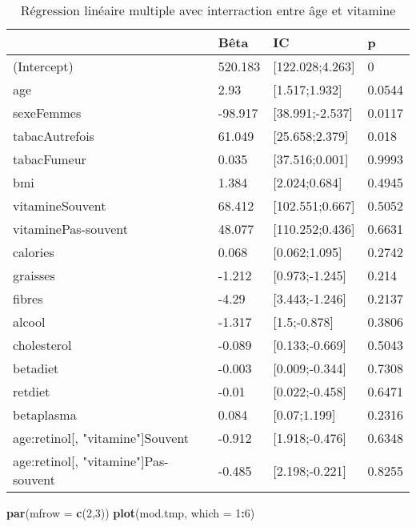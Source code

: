 \documentclass[]{article}
\newenvironment{Shaded}{\begin{snugshade}}{\end{snugshade}}
\newcommand{\KeywordTok}[1]{\textcolor[rgb]{0.13,0.29,0.53}{\textbf{#1}}}
\newcommand{\DataTypeTok}[1]{\textcolor[rgb]{0.13,0.29,0.53}{#1}}
\newcommand{\DecValTok}[1]{\textcolor[rgb]{0.00,0.00,0.81}{#1}}
\newcommand{\OperatorTok}[1]{\textcolor[rgb]{0.81,0.36,0.00}{\textbf{#1}}}
\newcommand{\NormalTok}[1]{#1}
\begin{document}
\begin{table}

\caption{\label{tab:unnamed-chunk-51}Régression linéaire multiple avec interraction entre âge et vitamine}
\centering
\begin{tabular}[t]{l|l|l|l}
\hline
  & Bêta & IC & p\\
\hline
\rowcolor[HTML]{BBD2E1}  (Intercept) & 520.183 & [122.028;4.263] & 0\\
\hline
age & 2.93 & [1.517;1.932] & 0.0544\\
\hline
\rowcolor[HTML]{BBD2E1}  sexeFemmes & -98.917 & [38.991;-2.537] & 0.0117\\
\hline
tabacAutrefois & 61.049 & [25.658;2.379] & 0.018\\
\hline
\rowcolor[HTML]{BBD2E1}  tabacFumeur & 0.035 & [37.516;0.001] & 0.9993\\
\hline
bmi & 1.384 & [2.024;0.684] & 0.4945\\
\hline
\rowcolor[HTML]{BBD2E1}  vitamineSouvent & 68.412 & [102.551;0.667] & 0.5052\\
\hline
vitaminePas-souvent & 48.077 & [110.252;0.436] & 0.6631\\
\hline
\rowcolor[HTML]{BBD2E1}  calories & 0.068 & [0.062;1.095] & 0.2742\\
\hline
graisses & -1.212 & [0.973;-1.245] & 0.214\\
\hline
\rowcolor[HTML]{BBD2E1}  fibres & -4.29 & [3.443;-1.246] & 0.2137\\
\hline
alcool & -1.317 & [1.5;-0.878] & 0.3806\\
\hline
\rowcolor[HTML]{BBD2E1}  cholesterol & -0.089 & [0.133;-0.669] & 0.5043\\
\hline
betadiet & -0.003 & [0.009;-0.344] & 0.7308\\
\hline
\rowcolor[HTML]{BBD2E1}  retdiet & -0.01 & [0.022;-0.458] & 0.6471\\
\hline
betaplasma & 0.084 & [0.07;1.199] & 0.2316\\
\hline
\rowcolor[HTML]{BBD2E1}  age:retinol[, "vitamine"]Souvent & -0.912 & [1.918;-0.476] & 0.6348\\
\hline
age:retinol[, "vitamine"]Pas-souvent & -0.485 & [2.198;-0.221] & 0.8255\\
\hline
\end{tabular}
\end{table}

\begin{Shaded}
\begin{Highlighting}[]
\KeywordTok{par}\NormalTok{(}\DataTypeTok{mfrow =} \KeywordTok{c}\NormalTok{(}\DecValTok{2}\NormalTok{,}\DecValTok{3}\NormalTok{))}
\KeywordTok{plot}\NormalTok{(mod.tmp, }\DataTypeTok{which =} \DecValTok{1}\OperatorTok{:}\DecValTok{6}\NormalTok{)}
\end{Highlighting}
\end{Shaded}
\end{document}
